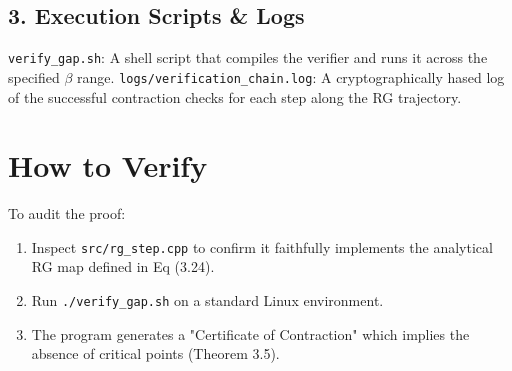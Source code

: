 \subsection{3. Execution Scripts & Logs}
\texttt{verify\_gap.sh}: A shell script that compiles the verifier and runs it across the specified $\beta$ range.
\texttt{logs/verification\_chain.log}: A cryptographically hased log of the successful contraction checks for each step along the RG trajectory.

\section{How to Verify}
To audit the proof:
\begin{enumerate}
    \item Inspect \texttt{src/rg\_step.cpp} to confirm it faithfully implements the analytical RG map defined in Eq (3.24).
    \item Run \texttt{./verify\_gap.sh} on a standard Linux environment.
    \item The program generates a "Certificate of Contraction" which implies the absence of critical points (Theorem 3.5).
\end{enumerate}
